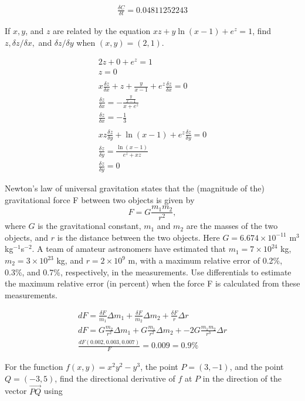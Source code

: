 \documentclass[12pt]{exam}
\begin{document}
\begin{questions}
\begin{solution}
\begin{gather*}
			\boxed{\frac{\delta C}{\delta t} = 0.04811252243} \tag*{\qed}
		\end{gather*}
	\end{solution}
\clearpage
\question If $x, y$, and $z$ are related by the equation $xz + y \ln(x - 1) + e^z = 1$, find $z, \delta z/\delta x,$ and $\delta z/\delta y$ when $(x, y) = (2, 1)$.
	\begin{solution}
		\begin{gather*}
			2z + 0 + e^z = 1\\
			\boxed{z=0} \\\\
			x\frac{\delta z}{\delta x} + z + \frac{y}{x - 1} + e^z\frac{\delta z}{\delta x} = 0 \\
			\frac{\delta z}{\delta x} = -\frac{\frac{y}{x - 1}}{x+e^z} \\
			\boxed{\frac{\delta z}{\delta x} = -\frac{1}{3}}\\\\
			xz\frac{\delta z}{\delta y} + \ln(x - 1) + e^z\frac{\delta z}{\delta y} = 0 \\
			\frac{\delta z}{\delta y} = \frac{\ln(x - 1)}{e^z + xz} \\
			\boxed{ \frac{\delta z}{\delta y} = 0} \tag*{\qed}
		\end{gather*}
	\end{solution}
\clearpage
\question Newton's law of universal gravitation states that the (magnitude of the) gravitational force F between two objects is given by
\[ F = G\frac{m_1m_2}{r^2}, \]
where $G$ is the gravitational constant, $m_1$ and $m_2$ are the masses of the two objects, and $r$ is the distance between the two objects. Here $G = 6.674 \times 10^{- 11}$ m$^3$kg$^{-1}$s$^{-2}$. A team of amateur astronomers have
estimated that $m_1 = 7 \times 10^{24}$ kg, $m_2 = 3 \times 10^{23}$ kg, and $r = 2 \times 10^9$ m, with a maximum relative error of 0.2\%, 0.3\%, and 0.7\%, respectively, in the measurements. Use differentials to estimate the maximum
relative error (in percent) when the force F is calculated from these measurements.
	\begin{solution}
		\begin{gather*}
			dF = \frac{\delta F}{m_1}\Delta m_1 + \frac{\delta F}{m_2}\Delta m_2 + \frac{\delta F}{r}\Delta r\\
			dF = G\frac{m_2}{r^2}\Delta m_1 + G\frac{m_1}{r^2}\Delta m_2 + -2G\frac{m_1m_2}{r^3}\Delta r\\
			\boxed{\frac{dF(0.002, 0.003, 0.007)}{F} = 0.009 = 0.9\%} \tag*{\qed}
		\end{gather*}
	\end{solution}
\clearpage
\question For the function $f(x, y) = x^2y^2 - y^3$, the point $P = (3, -1)$, and the point $Q = (-3, 5)$, find the
directional derivative of $f$ at $P$ in the direction of the vector $\overrightarrow{PQ}$ using
	\begin{parts}

\end{parts}
\end{questions}
\end{document}
